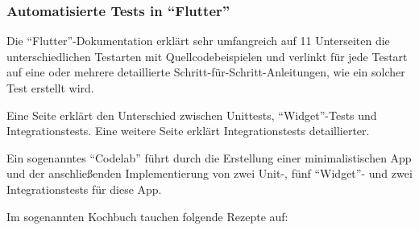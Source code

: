 \subsubsection{Automatisierte Tests in \enquote{Flutter}}
Die \enquote{Flutter}-Dokumentation erklärt sehr umfangreich auf 11 Unterseiten die unterschiedlichen Testarten mit Quellcodebeispielen
und verlinkt für jede Testart auf eine oder mehrere detaillierte Schritt-für-Schritt-Anleitungen,
wie ein solcher Test erstellt wird. 


Eine Seite erklärt den Unterschied zwischen Unittests, \enquote{Widget}-Tests und Integrationstests.
Eine weitere Seite erklärt Integrationstests detaillierter.

Ein sogenanntes \enquote{Codelab} führt durch die Erstellung einer minimalistischen App und der anschließenden Implementierung von zwei Unit-, fünf \enquote{Widget}- und zwei Integrationstests für diese App.

\clearpage
Im sogenannten Kochbuch tauchen folgende Rezepte auf:

